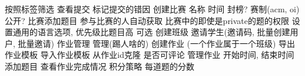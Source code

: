 \markdownRendererUlItem 按照标签筛选\markdownRendererUlItemEnd 
\markdownRendererUlEndTight \markdownRendererInterblockSeparator
{}\markdownRendererInterblockSeparator
{}\markdownRendererUlBeginTight
\markdownRendererUlItem 查看提交\markdownRendererUlItemEnd 
\markdownRendererUlItem 标记提交的错因\markdownRendererUlItemEnd 
\markdownRendererUlEndTight \markdownRendererInterblockSeparator
{}\markdownRendererInterblockSeparator
{}\markdownRendererUlBeginTight
\markdownRendererUlItem 创建比赛\markdownRendererUlItemEnd 
\markdownRendererUlItem 名称\markdownRendererUlItemEnd 
\markdownRendererUlItem 时间\markdownRendererUlItemEnd 
\markdownRendererUlItem 封榜?\markdownRendererUlItemEnd 
\markdownRendererUlItem 赛制(acm, oi)\markdownRendererUlItemEnd 
\markdownRendererUlItem {}\markdownRendererUlItemEnd 
\markdownRendererUlItem 公开?\markdownRendererUlItemEnd 
\markdownRendererUlItem 比赛添加题目\markdownRendererUlItemEnd 
\markdownRendererUlItem 参与比赛的人自动获取 比赛中的即使是private的题的权限\markdownRendererUlItemEnd 
\markdownRendererUlItem 设置通用的语言选项, 优先级比题目高  可选\markdownRendererUlItemEnd 
\markdownRendererUlEndTight \markdownRendererInterblockSeparator
{}\markdownRendererInterblockSeparator
{}\markdownRendererUlBeginTight
\markdownRendererUlItem 创建班级\markdownRendererUlItemEnd 
\markdownRendererUlItem 邀请学生(邀请码, 批量创建用户, 批量邀请)\markdownRendererUlItemEnd 
\markdownRendererUlItem 作业管理\markdownRendererUlItemEnd 
\markdownRendererUlItem 管理(踢人啥的)\markdownRendererUlItemEnd 
\markdownRendererUlEndTight \markdownRendererInterblockSeparator
{}\markdownRendererInterblockSeparator
{}\markdownRendererUlBeginTight
\markdownRendererUlItem 创建作业 (一个作业属于一个班级)\markdownRendererUlItemEnd 
\markdownRendererUlItem 导出作业模板\markdownRendererUlItemEnd 
\markdownRendererUlItem 导入作业模板\markdownRendererUlItemEnd 
\markdownRendererUlItem 从作业id克隆\markdownRendererUlItemEnd 
\markdownRendererUlItem 是否可评论\markdownRendererUlItemEnd 
\markdownRendererUlItem 管理作业\markdownRendererUlItemEnd 
\markdownRendererUlItem 开始时间, 结束时间\markdownRendererUlItemEnd 
\markdownRendererUlItem 添加题目\markdownRendererUlItemEnd 
\markdownRendererUlItem 查看作业完成情况\markdownRendererUlItemEnd 
\markdownRendererUlItem 积分策略\markdownRendererUlItemEnd 
\markdownRendererUlItem 每道题的分数\markdownRendererUlItemEnd 
